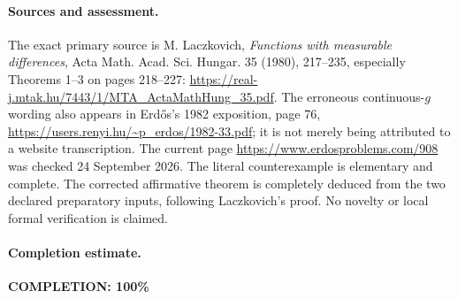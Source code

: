 \paragraph{Sources and assessment.}
The exact primary source is M. Laczkovich,
\emph{Functions with measurable differences},
Acta Math. Acad. Sci. Hungar. 35 (1980), 217--235,
especially Theorems 1--3 on pages 218--227:
\url{https://real-j.mtak.hu/7443/1/MTA_ActaMathHung_35.pdf}.
The erroneous continuous-\(g\) wording also appears
in Erd\H{o}s's 1982 exposition, page 76,
\url{https://users.renyi.hu/~p_erdos/1982-33.pdf};
it is not merely being attributed to a website transcription.
The current page
\url{https://www.erdosproblems.com/908} was checked
24 September 2026.
The literal counterexample is elementary and complete.
The corrected affirmative theorem is completely deduced
from the two declared preparatory inputs, following
Laczkovich's proof. No novelty or local formal
verification is claimed.

\paragraph{Completion estimate.}
\textbf{COMPLETION: 100\%}
